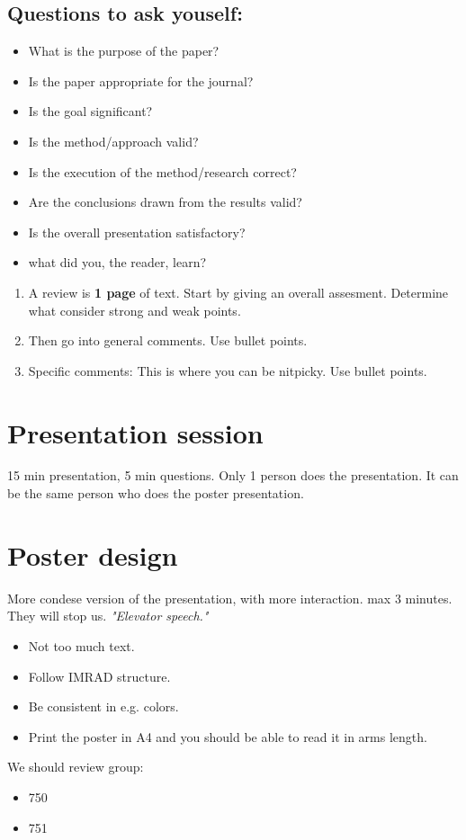 \documentclass[a4paper]{article}
\begin{document}
\subsection{Questions to ask youself:}
\begin{itemize}
	\item What is the purpose of the paper?
	\item Is the paper appropriate for the journal?
	\item Is the goal significant?
	\item Is the method/approach valid?
	\item Is the execution of the method/research correct?
	\item Are the conclusions drawn from the results valid?
	\item Is the overall presentation satisfactory?
	\item what did you, the reader, learn?
\end{itemize}

\begin{enumerate}
	\item A review is \textbf{1 page} of text. Start by giving an overall assesment. Determine what consider strong and weak points.
	\item Then go into general comments. Use bullet points.
	\item Specific comments: This is where you can be nitpicky. Use bullet points.
\end{enumerate}

\section{Presentation session}
15 min presentation, 5 min questions. Only 1 person does the presentation. It can be the same person who does the poster presentation.

\section{Poster design}
More condese version of the presentation, with more interaction. max 3 minutes. They will stop us. \textit{"Elevator speech."} 

\begin{itemize}
	\item Not too much text. 
	\item Follow IMRAD structure.
	\item Be consistent in e.g. colors.
	\item Print the poster in A4 and you should be able to read it in arms length. 
\end{itemize}


We should review group:
\begin{itemize}
	\item 750
	\item 751
\end{itemize}
\end{document}
